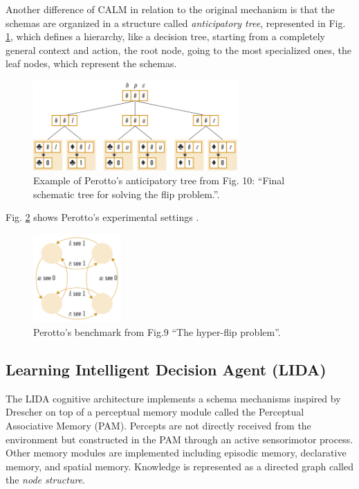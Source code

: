 \documentclass[runningheads]{llncs}
\begin{document}
Another difference of CALM in relation to the original mechanism is that the schemas are organized in a structure called \textit{anticipatory tree}, represented in Fig. \ref{fig:perotto_tree}, which defines a hierarchy, like a decision tree, starting from a completely general context and action, the root node, going to the most specialized ones, the leaf nodes, which represent the schemas.

\begin{figure}
	\centering
	\includegraphics[width=0.7\textwidth]{Figure_perotto_tree.png}
	\caption{Example of Perotto's anticipatory tree from \cite{Perotto:2013:CF} Fig. 10: ``Final schematic tree for solving the flip problem.''.
 } 
	\label{fig:perotto_tree}
\end{figure}

Fig. \ref{fig:perotto_ben} shows Perotto's experimental settings \cite{Perotto:2013:CF}.

\begin{figure}
	\centering
	\includegraphics[width=0.3\textwidth]{Figure_perotto_benchmark.png}
	\caption{Perotto's benchmark from \cite{Perotto:2013:CF} Fig.9 ``The hyper-flip problem''.} 
	\label{fig:perotto_ben}
\end{figure}




\subsection{Learning Intelligent Decision Agent (LIDA)}

The LIDA cognitive architecture \cite{kugele_learning_2021}  implements a schema mechanisms inspired by Drescher on top of a perceptual memory module called the Perceptual Associative Memory (PAM). 
Percepts are not directly received from the environment but constructed in the PAM through an active sensorimotor process. 
Other memory modules are implemented including episodic memory, declarative memory, and spatial memory.
Knowledge is represented as a directed graph called the \textit{node structure}. 
\end{document}
